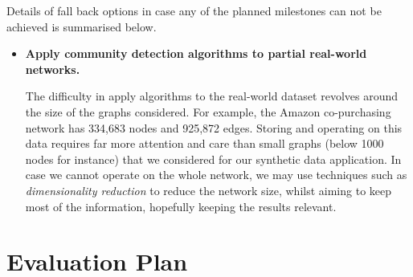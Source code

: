 \documentclass[12pt]{article}
\numberwithin{equation}{section}
\begin{document}
Details of fall back options in case any of the planned milestones can not be achieved is summarised below.
\begin{itemize}
	\item \textbf{Apply community detection algorithms to partial real-world networks.}

	The difficulty in apply algorithms to the real-world dataset revolves around the size of the graphs considered. For example, the Amazon co-purchasing network has 334,683 nodes and 925,872 edges. Storing and operating on this data requires far more attention and care than small graphs (below 1000 nodes for instance) that we considered for our synthetic data application. In case we cannot operate on the whole network, we may use techniques such as \textit{dimensionality reduction} to reduce the network size, whilst aiming to keep most of the information, hopefully keeping the results relevant.
\end{itemize}


\newpage
\thispagestyle{plain}
\mbox{}
\section {Evaluation Plan}
\label{sec:evaluationPlan}


\newpage
\thispagestyle{plain}
\mbox{}



\end{document}
